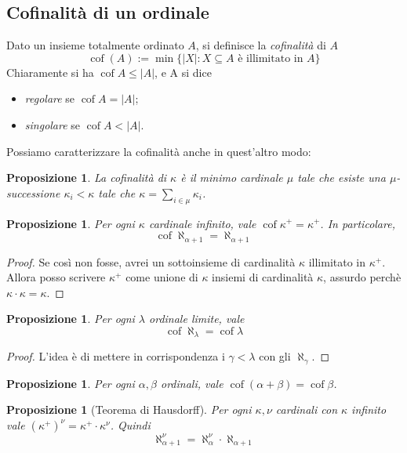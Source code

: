 \documentclass[a4paper,10pt,oneside]{article}
\DeclareMathOperator{\cof}{cof}
\newcommand{\myname}[1]{\emph{#1}}
\theoremstyle{plain}
\newtheorem{myprop}[mytheorem]{Proposizione}
\theoremstyle{definition}
\theoremstyle{remark}
\begin{document}

\subsection{Cofinalità di un ordinale}

Dato un insieme totalmente ordinato $A$, si definisce la \myname{cofinalità} di $A$
\[ \cof(A) := \min\{|X|:X\subseteq A \textrm{ è illimitato in }A\}\]  
Chiaramente si ha $\cof A \le |A|$, e A si dice
\begin{itemize}
 \item \myname{regolare} se $\cof A=|A|$;
 \item \myname{singolare} se $\cof A<|A|$.
\end{itemize}

Possiamo caratterizzare la cofinalità anche in quest'altro modo:
\begin{myprop}

 La cofinalità di $\kappa$ è il minimo cardinale $\mu$ tale che esiste una $\mu$-successione $\kappa_i<\kappa$ tale che $\kappa =\sum_{i\in \mu} \kappa_i$.
\end{myprop}

\begin{myprop}
 Per ogni $\kappa$ cardinale infinito, vale $\cof\kappa^+ = \kappa^+$. In particolare, \[\cof\aleph_{\alpha+1}=\aleph_{\alpha+1}\]
\end{myprop}
\begin{proof}
 Se così non fosse, avrei un sottoinsieme di cardinalità $\kappa$ illimitato in $\kappa^+$. Allora posso scrivere $\kappa^+$ come unione di $\kappa$ insiemi di cardinalità $\kappa$, assurdo perchè $\kappa\cdot\kappa=\kappa$.
\end{proof}
\begin{myprop}
 Per ogni $\lambda$ ordinale limite, vale \[\cof \aleph_\lambda =\cof \lambda\]
\end{myprop}
\begin{proof}
 L'idea è di mettere in corrispondenza i $\gamma < \lambda$ con gli $\aleph_\gamma$.
\end{proof}

\begin{myprop}
 Per ogni $\alpha, \beta$ ordinali, vale $\cof(\alpha+\beta) = \cof \beta$.
\end{myprop}

\begin{myprop}[Teorema di Hausdorff]
 Per ogni $\kappa,\nu$ cardinali con $\kappa$ infinito vale ${\left(\kappa^+\right)}^\nu=\kappa^+\cdot \kappa^\nu$. Quindi
 \[\aleph_{\alpha+1}^\nu=\aleph_{\alpha}^\nu\cdot \aleph_{\alpha+1}\]
\end{myprop}
\end{document}
